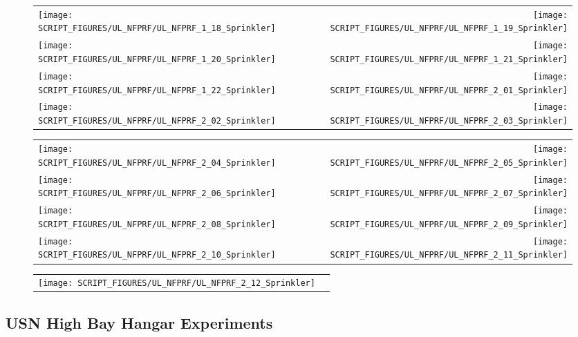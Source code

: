 \begin{figure}[!ht]
\begin{tabular*}{\textwidth}{l@{\extracolsep{\fill}}r}
\texttt{[image: SCRIPT\_FIGURES/UL\_NFPRF/UL\_NFPRF\_1\_18\_Sprinkler]} &
\texttt{[image: SCRIPT\_FIGURES/UL\_NFPRF/UL\_NFPRF\_1\_19\_Sprinkler]} \\
\texttt{[image: SCRIPT\_FIGURES/UL\_NFPRF/UL\_NFPRF\_1\_20\_Sprinkler]} &
\texttt{[image: SCRIPT\_FIGURES/UL\_NFPRF/UL\_NFPRF\_1\_21\_Sprinkler]} \\
\texttt{[image: SCRIPT\_FIGURES/UL\_NFPRF/UL\_NFPRF\_1\_22\_Sprinkler]} &
\texttt{[image: SCRIPT\_FIGURES/UL\_NFPRF/UL\_NFPRF\_2\_01\_Sprinkler]} \\
\texttt{[image: SCRIPT\_FIGURES/UL\_NFPRF/UL\_NFPRF\_2\_02\_Sprinkler]} &
\texttt{[image: SCRIPT\_FIGURES/UL\_NFPRF/UL\_NFPRF\_2\_03\_Sprinkler]}
\end{tabular*}
\end{figure}

\begin{figure}[!ht]
\begin{tabular*}{\textwidth}{l@{\extracolsep{\fill}}r}
\texttt{[image: SCRIPT\_FIGURES/UL\_NFPRF/UL\_NFPRF\_2\_04\_Sprinkler]} &
\texttt{[image: SCRIPT\_FIGURES/UL\_NFPRF/UL\_NFPRF\_2\_05\_Sprinkler]} \\
\texttt{[image: SCRIPT\_FIGURES/UL\_NFPRF/UL\_NFPRF\_2\_06\_Sprinkler]} &
\texttt{[image: SCRIPT\_FIGURES/UL\_NFPRF/UL\_NFPRF\_2\_07\_Sprinkler]} \\
\texttt{[image: SCRIPT\_FIGURES/UL\_NFPRF/UL\_NFPRF\_2\_08\_Sprinkler]} &
\texttt{[image: SCRIPT\_FIGURES/UL\_NFPRF/UL\_NFPRF\_2\_09\_Sprinkler]} \\
\texttt{[image: SCRIPT\_FIGURES/UL\_NFPRF/UL\_NFPRF\_2\_10\_Sprinkler]} &
\texttt{[image: SCRIPT\_FIGURES/UL\_NFPRF/UL\_NFPRF\_2\_11\_Sprinkler]}
\end{tabular*}
\end{figure}

\begin{figure}[!ht]
\begin{tabular*}{\textwidth}{l@{\extracolsep{\fill}}r}
\texttt{[image: SCRIPT\_FIGURES/UL\_NFPRF/UL\_NFPRF\_2\_12\_Sprinkler]}
\end{tabular*}
\end{figure}

\clearpage

\subsection{USN High Bay Hangar Experiments}

